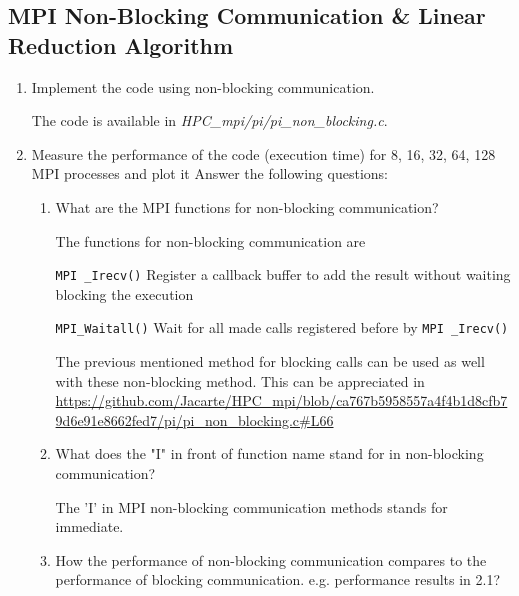 \documentclass[12pt]{article}
\begin{document}
\subsection{MPI Non-Blocking Communication \& Linear Reduction Algorithm}

\begin{enumerate}
	\item Implement the code using non-blocking communication.
	
	The code is available in \textit{HPC\_mpi/pi/pi\_non\_blocking.c}.
	\item  Measure the performance of the code (execution time) for 8, 16, 32,  64, 128 MPI processes and plot it
	Answer the following questions:
	\begin{enumerate}
		\item What are the MPI functions for non-blocking communication? 
		
		The functions for non-blocking communication are 
		
		\texttt{MPI
		\_Irecv()} Register a callback buffer to add the result without waiting blocking the execution


		\texttt{MPI\_Waitall()} Wait for all made calls registered before by \texttt{MPI
		\_Irecv()}

		The previous mentioned method for blocking calls can be used as well with these non-blocking method. This can be appreciated in \url{https://github.com/Jacarte/HPC_mpi/blob/ca767b5958557a4f4b1d8cfb79d6e91e8662fed7/pi/pi_non_blocking.c#L66}

		

		\item What does the "I" in front of function name stand for in non-blocking communication?
		
		The 'I' in MPI non-blocking communication methods stands for immediate.

		\item How the performance of non-blocking communication compares to the performance of blocking communication. e.g. performance results in 2.1?
  

\end{enumerate}
\end{enumerate}
\end{document}
